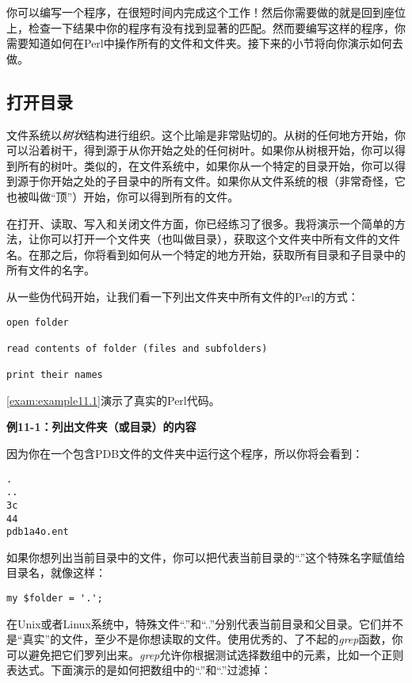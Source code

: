 你可以编写一个程序，在很短时间内完成这个工作！然后你需要做的就是回到座位上，检查一下结果中你的程序有没有找到显著的匹配。然而要编写这样的程序，你需要知道如何在Perl中操作所有的文件和文件夹。接下来的小节将向你演示如何去做。

\subsection{打开目录}
文件系统以\textit{树状}结构进行组织。这个比喻是非常贴切的。从树的任何地方开始，你可以沿着树干，得到源于从你开始之处的任何树叶。如果你从树根开始，你可以得到所有的树叶。类似的，在文件系统中，如果你从一个特定的目录开始，你可以得到源于你开始之处的子目录中的所有文件。如果你从文件系统的根（非常奇怪，它也被叫做“顶”）开始，你可以得到所有的文件。

在打开、读取、写入和关闭文件方面，你已经练习了很多。我将演示一个简单的方法，让你可以打开一个文件夹（也叫做目录），获取这个文件夹中所有文件的文件名。在那之后，你将看到如何从一个特定的地方开始，获取所有目录和子目录中的所有文件的名字。

从一些伪代码开始，让我们看一下列出文件夹中所有文件的Perl的方式：

\begin{lstlisting}
open folder

read contents of folder (files and subfolders)

print their names
\end{lstlisting}

\autoref{exam:example11.1}演示了真实的Perl代码。

\textbf{例11-1：列出文件夹（或目录）的内容}


因为你在一个包含PDB文件的文件夹中运行这个程序，所以你将会看到：

\begin{lstlisting}
.
..
3c
44
pdb1a4o.ent
\end{lstlisting}

如果你想列出当前目录中的文件，你可以把代表当前目录的“.”这个特殊名字赋值给目录名，就像这样：

\begin{lstlisting}
my $folder = '.';
\end{lstlisting}

在Unix或者Linux系统中，特殊文件“.”和“..”分别代表当前目录和父目录。它们并不是“真实”的文件，至少不是你想读取的文件。使用优秀的、了不起的\textit{grep}函数，你可以避免把它们罗列出来。\textit{grep}允许你根据测试选择数组中的元素，比如一个正则表达式。下面演示的是如何把数组中的“.”和“.”过滤掉：

